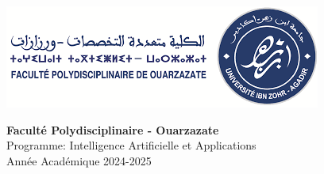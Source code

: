 \documentclass[12pt,a4paper]{article}
\author{}
\date{}
\begin{document}
 

\begin{titlepage} 
    \centering 
    \vspace*{-0.5cm} 
     \begin{center} 
         \begin{minipage}{0.15\textwidth}
             \centering
             \includegraphics[width=\textwidth]{logo (3).png}
         \end{minipage}
         \hfill
         \begin{minipage}{0.7\textwidth}
             \centering
             {\large\bfseries\color{primaryblue} Faculté Polydisciplinaire - Ouarzazate}\\[0.1cm] 
             {\normalsize\color{darkgray} Programme: Intelligence Artificielle et Applications}\\[0.1cm] 
             {\normalsize\color{darkgray} Année Académique 2024-2025}
         \end{minipage}
         \hfill
         

\end{center}
\end{titlepage}
\end{document}
